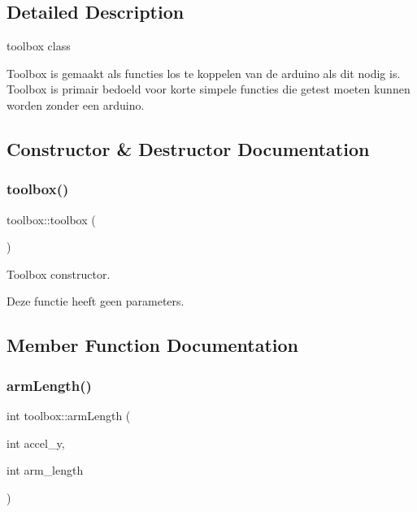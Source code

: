 \subsection{Detailed Description}
toolbox class 

Toolbox is gemaakt als functies los te koppelen van de arduino als dit nodig is. Toolbox is primair bedoeld voor korte simpele functies die getest moeten kunnen worden zonder een arduino. 

\subsection{Constructor \& Destructor Documentation}
\mbox{\label{classtoolbox_ae52c33dc9f80c6ce0208a70abde2418e}} 
\subsubsection{\texorpdfstring{toolbox()}{toolbox()}}
{\footnotesize\ttfamily toolbox\+::toolbox (\begin{DoxyParamCaption}{ }\end{DoxyParamCaption})\hspace{0.3cm}{\ttfamily [inline]}}



Toolbox constructor. 

Deze functie heeft geen parameters. 

\subsection{Member Function Documentation}
\mbox{\label{classtoolbox_a9a2412a49c1268f8413c1fb580edc042}} 
\subsubsection{\texorpdfstring{arm\+Length()}{armLength()}}
{\footnotesize\ttfamily int toolbox\+::arm\+Length (\begin{DoxyParamCaption}\item[{int}]{accel\+\_\+y,  }\item[{int}]{arm\+\_\+length }\end{DoxyParamCaption})\hspace{0.3cm}{\ttfamily [inline]}}



